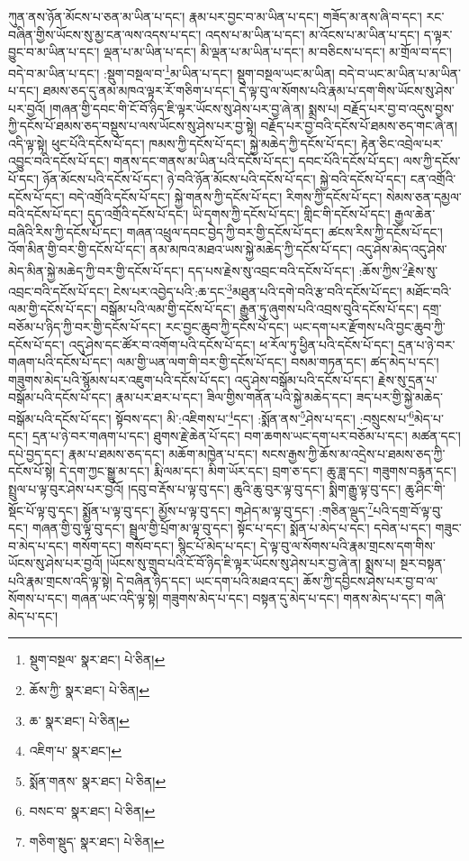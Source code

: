ཀུན་ནས་ཉོན་མོངས་པ་ཅན་མ་ཡིན་པ་དང་། རྣམ་པར་བྱང་བ་མ་ཡིན་པ་དང་། གཟོད་མ་ནས་ཞི་བ་དང་། རང་བཞིན་གྱིས་ཡོངས་སུ་མྱ་ངན་ལས་འདས་པ་དང་། འདས་པ་མ་ཡིན་པ་དང་། མ་འོངས་པ་མ་ཡིན་པ་དང་། ད་ལྟར་བྱུང་བ་མ་ཡིན་པ་དང་། ལྡན་པ་མ་ཡིན་པ་དང་། མི་ལྡན་པ་མ་ཡིན་པ་དང་། མ་བཅིངས་པ་དང་། མ་གྲོལ་བ་དང་། བདེ་བ་མ་ཡིན་པ་དང་། :སྡུག་བསྔལ་བ་\footnote{སྡུག་བསྔལ་  སྣར་ཐང་།  པེ་ཅིན། }མ་ཡིན་པ་དང་། སྡུག་བསྔལ་ཡང་མ་ཡིན། བདེ་བ་ཡང་མ་ཡིན་པ་མ་ཡིན་པ་དང་། ཐམས་ཅད་དུ་ནམ་མཁའ་ལྟར་རོ་གཅིག་པ་དང་། དེ་ལྟ་བུ་ལ་སོགས་པའི་རྣམ་པ་དག་གིས་ཡོངས་སུ་ཤེས་པར་བྱའོ། །གཞན་གྱི་དབང་གི་ངོ་བོ་ཉིད་ཇི་ལྟར་ཡོངས་སུ་ཤེས་པར་བྱ་ཞེ་ན། སྨྲས་པ། བརྗོད་པར་བྱ་བ་འདུས་བྱས་ཀྱི་དངོས་པོ་ཐམས་ཅད་བསྡུས་པ་ལས་ཡོངས་སུ་ཤེས་པར་བྱ་སྟེ། བརྗོད་པར་བྱ་བའི་དངོས་པོ་ཐམས་ཅད་གང་ཞེ་ན། འདི་ལྟ་སྟེ། ཕུང་པོའི་དངོས་པོ་དང་། ཁམས་ཀྱི་དངོས་པོ་དང་། སྐྱེ་མཆེད་ཀྱི་དངོས་པོ་དང་། རྟེན་ཅིང་འབྲེལ་པར་འབྱུང་བའི་དངོས་པོ་དང་། གནས་དང་གནས་མ་ཡིན་པའི་དངོས་པོ་དང་། དབང་པོའི་དངོས་པོ་དང་། ལས་ཀྱི་དངོས་པོ་དང་། ཉོན་མོངས་པའི་དངོས་པོ་དང་། ཉེ་བའི་ཉོན་མོངས་པའི་དངོས་པོ་དང་། སྐྱེ་བའི་དངོས་པོ་དང་། ངན་འགྲོའི་དངོས་པོ་དང་། བདེ་འགྲོའི་དངོས་པོ་དང་། སྐྱེ་གནས་ཀྱི་དངོས་པོ་དང་། རིགས་ཀྱི་དངོས་པོ་དང་། སེམས་ཅན་དམྱལ་བའི་དངོས་པོ་དང་། དུད་འགྲོའི་དངོས་པོ་དང་། ཡི་དྭགས་ཀྱི་དངོས་པོ་དང་། གླིང་གི་དངོས་པོ་དང་། རྒྱལ་ཆེན་བཞིའི་རིས་ཀྱི་དངོས་པོ་དང་། གཞན་འཕྲུལ་དབང་བྱེད་ཀྱི་བར་གྱི་དངོས་པོ་དང་། ཚངས་རིས་ཀྱི་དངོས་པོ་དང་། འོག་མིན་གྱི་བར་གྱི་དངོས་པོ་དང་། ནམ་མཁའ་མཐའ་ཡས་སྐྱེ་མཆེད་ཀྱི་དངོས་པོ་དང་། འདུ་ཤེས་མེད་འདུ་ཤེས་མེད་མིན་སྐྱེ་མཆེད་ཀྱི་བར་གྱི་དངོས་པོ་དང་། དད་པས་རྗེས་སུ་འབྲང་བའི་དངོས་པོ་དང་། :ཆོས་ཀྱིས་\footnote{ཆོས་ཀྱི་  སྣར་ཐང་།  པེ་ཅིན། }རྗེས་སུ་འབྲང་བའི་དངོས་པོ་དང་། ངེས་པར་འབྱེད་པའི་:ཆ་དང་\footnote{ཆ་  སྣར་ཐང་།  པེ་ཅིན། }མཐུན་པའི་དགེ་བའི་རྩ་བའི་དངོས་པོ་དང་། མཐོང་བའི་ལམ་གྱི་དངོས་པོ་དང་། བསྒོམ་པའི་ལམ་གྱི་དངོས་པོ་དང་། རྒྱུན་ཏུ་ཞུགས་པའི་འབྲས་བུའི་དངོས་པོ་དང་། དགྲ་བཅོམ་པ་ཉིད་ཀྱི་བར་གྱི་དངོས་པོ་དང་། རང་བྱང་ཆུབ་ཀྱི་དངོས་པོ་དང་། ཡང་དག་པར་རྫོགས་པའི་བྱང་ཆུབ་ཀྱི་དངོས་པོ་དང་། འདུ་ཤེས་དང་ཚོར་བ་འགོག་པའི་དངོས་པོ་དང་། ཕ་རོལ་ཏུ་ཕྱིན་པའི་དངོས་པོ་དང་། དྲན་པ་ཉེ་བར་གཞག་པའི་དངོས་པོ་དང་། ལམ་གྱི་ཡན་ལག་གི་བར་གྱི་དངོས་པོ་དང་། བསམ་གཏན་དང་། ཚད་མེད་པ་དང་། གཟུགས་མེད་པའི་སྙོམས་པར་འཇུག་པའི་དངོས་པོ་དང་། འདུ་ཤེས་བསྒོམ་པའི་དངོས་པོ་དང་། རྗེས་སུ་དྲན་པ་བསྒོམ་པའི་དངོས་པོ་དང་། རྣམ་པར་ཐར་པ་དང་། ཟིལ་གྱིས་གནོན་པའི་སྐྱེ་མཆེད་དང་། ཟད་པར་གྱི་སྐྱེ་མཆེད་བསྒོམ་པའི་དངོས་པོ་དང་། སྟོབས་དང་། མི་:འཇིགས་པ་\footnote{འཇིག་པ་  སྣར་ཐང་། }དང་། :སྨོན་ནས་\footnote{སྨོན་གནས་  སྣར་ཐང་།  པེ་ཅིན། }ཤེས་པ་དང་། :བསྲུངས་པ་\footnote{བསང་བ་  སྣར་ཐང་།  པེ་ཅིན། }མེད་པ་དང་། དྲན་པ་ཉེ་བར་གཞག་པ་དང་། ཐུགས་རྗེ་ཆེན་པོ་དང་། བག་ཆགས་ཡང་དག་པར་བཅོམ་པ་དང་། མཚན་དང་། དཔེ་བྱད་དང་། རྣམ་པ་ཐམས་ཅད་དང་། མཆོག་མཁྱེན་པ་དང་། སངས་རྒྱས་ཀྱི་ཆོས་མ་འདྲེས་པ་ཐམས་ཅད་ཀྱི་དངོས་པོ་སྟེ། དེ་དག་ཀྱང་སྒྱུ་མ་དང་། རྨི་ལམ་དང་། མིག་ཡོར་དང་། བྲག་ཅ་དང་། ཆུ་ཟླ་དང་། གཟུགས་བརྙན་དང་། སྤྲུལ་པ་ལྟ་བུར་ཤེས་པར་བྱའོ། །དབུ་བ་རྡོས་པ་ལྟ་བུ་དང་། ཆུའི་ཆུ་བུར་ལྟ་བུ་དང་། སྨིག་རྒྱུ་ལྟ་བུ་དང་། ཆུ་ཤིང་གི་སྡོང་པོ་ལྟ་བུ་དང་། སྨྱོན་པ་ལྟ་བུ་དང་། མྱོས་པ་ལྟ་བུ་དང་། གཤེད་མ་ལྟ་བུ་དང་། :གཅིན་ལྡུད་\footnote{གཅིག་སྡུད་  སྣར་ཐང་།  པེ་ཅིན། }པའི་དགྲ་བོ་ལྟ་བུ་དང་། གཞན་གྱི་བུ་ལྟ་བུ་དང་། སྦྲུལ་གྱི་པྲོག་མ་ལྟ་བུ་དང་། སྟོང་པ་དང་། སྨོན་པ་མེད་པ་དང་། དབེན་པ་དང་། གཟུང་བ་མེད་པ་དང་། གསོག་དང་། གསོབ་དང་། སྙིང་པོ་མེད་པ་དང་། དེ་ལྟ་བུ་ལ་སོགས་པའི་རྣམ་གྲངས་དག་གིས་ཡོངས་སུ་ཤེས་པར་བྱའོ། །ཡོངས་སུ་གྲུབ་པའི་ངོ་བོ་ཉིད་ཇི་ལྟར་ཡོངས་སུ་ཤེས་པར་བྱ་ཞེ་ན། སྨྲས་པ། སྔར་བསྟན་པའི་རྣམ་གྲངས་འདི་ལྟ་སྟེ། དེ་བཞིན་ཉིད་དང་། ཡང་དག་པའི་མཐའ་དང་། ཆོས་ཀྱི་དབྱིངས་ཤེས་པར་བྱ་བ་ལ་སོགས་པ་དང་། གཞན་ཡང་འདི་ལྟ་སྟེ། གཟུགས་མེད་པ་དང་། བསྟན་དུ་མེད་པ་དང་། གནས་མེད་པ་དང་། གཞི་མེད་པ་དང་། 